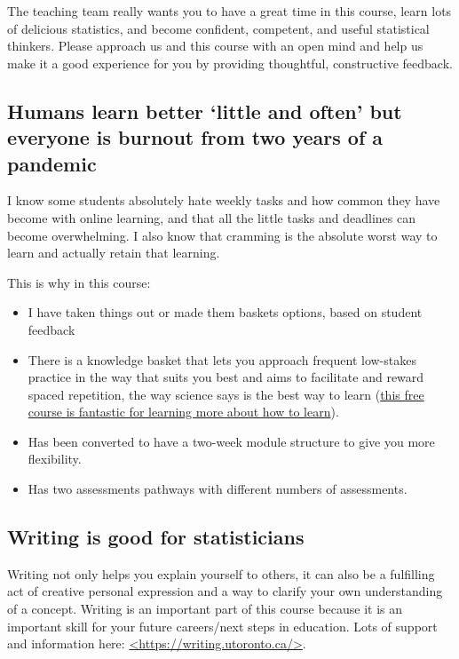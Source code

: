 \documentclass[
  openany]{book}
\begin{document}
The teaching team really wants you to have a great time in this course, learn lots of delicious statistics, and become confident, competent, and useful statistical thinkers. Please approach us and this course with an open mind and help us make it a good experience for you by providing thoughtful, constructive feedback.

\hypertarget{humans-learn-better-little-and-often-but-everyone-is-burnout-from-two-years-of-a-pandemic}{%
\subsection{Humans learn better `little and often' but everyone is burnout from two years of a pandemic}\label{humans-learn-better-little-and-often-but-everyone-is-burnout-from-two-years-of-a-pandemic}}

I know some students absolutely hate weekly tasks and how common they have become with online learning, and that all the little tasks and deadlines can become overwhelming. I also know that cramming is the absolute worst way to learn and actually retain that learning.

This is why in this course:

\begin{itemize}
\item
  I have taken things out or made them baskets options, based on student feedback
\item
  There is a knowledge basket that lets you approach frequent low-stakes practice in the way that suits you best and aims to facilitate and reward spaced repetition, the way science says is the best way to learn (\href{http://www.coursera.org/learn/learning-how-to-learn}{this free course is fantastic for learning more about how to learn}).
\item
  Has been converted to have a two-week module structure to give you more flexibility.
\item
  Has two assessments pathways with different numbers of assessments.
\end{itemize}

\hypertarget{writing-is-good-for-statisticians}{%
\subsection{Writing is good for statisticians}\label{writing-is-good-for-statisticians}}

Writing not only helps you explain yourself to others, it can also be a fulfilling act of creative personal expression and a way to clarify your own understanding of a concept. Writing is an important part of this course because it is an important skill for your future careers/next steps in education. Lots of support and information here: \href{https://writing.utoronto.ca}{\textless https://writing.utoronto.ca/\textgreater{}}.
\end{document}
